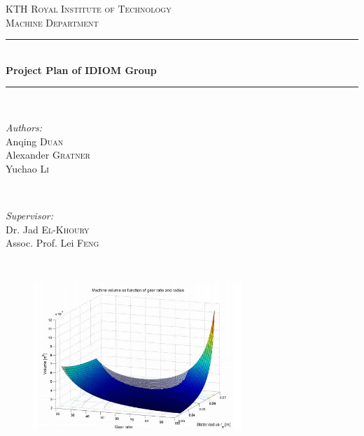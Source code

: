 \documentclass[12pt]{article} %
\begin{document}

\begin{titlepage}

\newcommand{\HRule}{\rule{\linewidth}{0.5mm}} %

\center %

\textsc{\LARGE KTH Royal Institute of Technology}\\[1.5cm] %
\textsc{\Large Machine Department}\\[0.5cm] %


\HRule \\[0.4cm]
{ \huge \bfseries Project Plan of IDIOM Group}\\[0.4cm] %
\HRule \\[1.5cm]

\begin{minipage}{0.4\textwidth}
\begin{flushleft} \large
\emph{Authors:}\\
Anqing \textsc{Duan}\\
Alexander \textsc{Gratner}\\
Yuchao \textsc{Li}
\end{flushleft}
\end{minipage}
~
\begin{minipage}{0.4\textwidth}
\begin{flushright} \large
\emph{Supervisor:} \\
Dr. Jad \textsc{El-Khoury}\\
Assoc. Prof. Lei \textsc{Feng} %
\end{flushright}
\end{minipage}\\[1cm]

\begin{figure}[!h]
  \centering
    \includegraphics[width=0.7\textwidth]{Pictures/cover.jpg}


\end{figure}
\end{titlepage}
\end{document}
